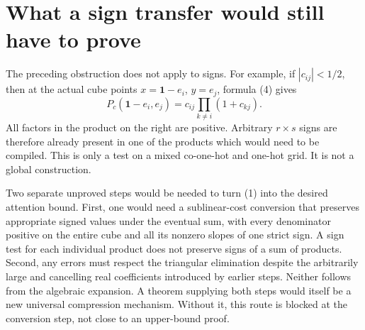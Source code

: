 \documentclass[11pt]{article}
\begin{document}
\section*{What a sign transfer would still have to prove}
The preceding obstruction does not apply to signs. For example, if
$|c_{ij}|<1/2$, then at the actual cube points
$x=\boldsymbol1-e_i$, $y=e_j$, formula (4) gives
\[
 P_c(\boldsymbol1-e_i,e_j)
     =c_{ij}\prod_{k\ne i}(1+c_{kj}).
 \tag{7}
\]
All factors in the product on the right are positive. Arbitrary
$r\times s$ signs are therefore already present in one of the products
which would need to be compiled. This is only a test on a mixed
co-one-hot and one-hot grid. It is not a global construction.

Two separate unproved steps would be needed to turn (1) into the desired
attention bound. First, one would need a sublinear-cost conversion that
preserves appropriate signed values under the eventual sum, with every
denominator positive on the entire cube and all its nonzero slopes of
one strict sign. A sign test for each individual product does not
preserve signs of a sum of products. Second, any errors must respect
the triangular elimination despite the arbitrarily large and cancelling
real coefficients introduced by earlier steps. Neither follows from
the algebraic expansion. A theorem supplying both steps would itself
be a new universal compression mechanism. Without it, this route is
blocked at the conversion step, not close to an upper-bound proof.
\end{document}
